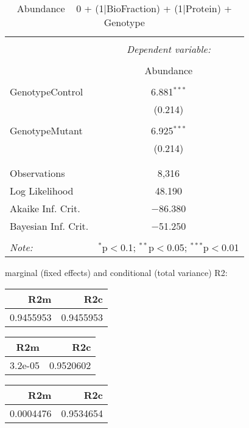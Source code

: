 \documentclass[11pt]{report}
\begin{document}
\begin{table}[!htbp] \centering 
  \caption{Abundance ~ 0 + (1|BioFraction) + (1|Protein) + Genotype} 
  \label{} 
\begin{tabular}{@{\extracolsep{5pt}}lc} 
\\[-1.8ex]\hline 
\hline \\[-1.8ex] 
 & \multicolumn{1}{c}{\textit{Dependent variable:}} \\ 
\cline{2-2} 
\\[-1.8ex] & Abundance \\ 
\hline \\[-1.8ex] 
 GenotypeControl & 6.881$^{***}$ \\ 
  & (0.214) \\ 
  & \\ 
 GenotypeMutant & 6.925$^{***}$ \\ 
  & (0.214) \\ 
  & \\ 
\hline \\[-1.8ex] 
Observations & 8,316 \\ 
Log Likelihood & 48.190 \\ 
Akaike Inf. Crit. & $-$86.380 \\ 
Bayesian Inf. Crit. & $-$51.250 \\ 
\hline 
\hline \\[-1.8ex] 
\textit{Note:}  & \multicolumn{1}{r}{$^{*}$p$<$0.1; $^{**}$p$<$0.05; $^{***}$p$<$0.01} \\ 
\end{tabular} 
\end{table} 
marginal (fixed effects) and conditional (total variance) R2:

\begin{tabular}{r|r}
\hline
R2m & R2c\\
\hline
0.9455953 & 0.9455953\\
\hline
\end{tabular}

\begin{tabular}{r|r}
\hline
R2m & R2c\\
\hline
3.2e-05 & 0.9520602\\
\hline
\end{tabular}

\begin{tabular}{r|r}
\hline
R2m & R2c\\
\hline
0.0004476 & 0.9534654\\
\hline
\end{tabular}
\end{document}
